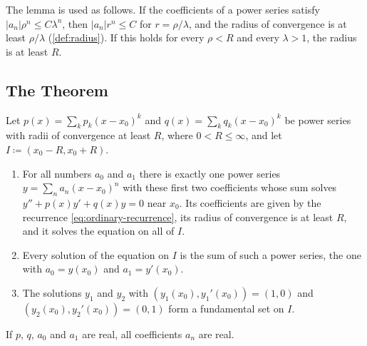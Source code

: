 The lemma is used as follows. If the coefficients of a power series satisfy $|a_n|\rho^n\le C\lambda^n$, then $|a_n|r^n\le C$ for $r=\rho/\lambda$, and the radius of convergence is at least $\rho/\lambda$ (\cref{def:radius}). If this holds for every $\rho<R$ and every $\lambda>1$, the radius is at least $R$.

\subsection{The Theorem}

\begin{theorem}
\label{thm:ordinary-point}
Let $p(x)=\sum_kp_k(x-x_0)^k$ and $q(x)=\sum_kq_k(x-x_0)^k$ be power series with radii of convergence at least $R$, where $0<R\le\infty$, and let $I\coloneqq(x_0-R,x_0+R)$.
\begin{enumerate}
\item For all numbers $a_0$ and $a_1$ there is exactly one power series $y=\sum_na_n(x-x_0)^n$ with these first two coefficients whose sum solves $y''+p(x)y'+q(x)y=0$ near $x_0$. Its coefficients are given by the recurrence \eqref{eq:ordinary-recurrence}, its radius of convergence is at least $R$, and it solves the equation on all of $I$.
\item Every solution of the equation on $I$ is the sum of such a power series, the one with $a_0=y(x_0)$ and $a_1=y'(x_0)$.
\item The solutions $y_1$ and $y_2$ with $(y_1(x_0),y_1'(x_0))=(1,0)$ and $(y_2(x_0),y_2'(x_0))=(0,1)$ form a fundamental set on $I$.
\end{enumerate}
If $p$, $q$, $a_0$ and $a_1$ are real, all coefficients $a_n$ are real.
\end{theorem}

